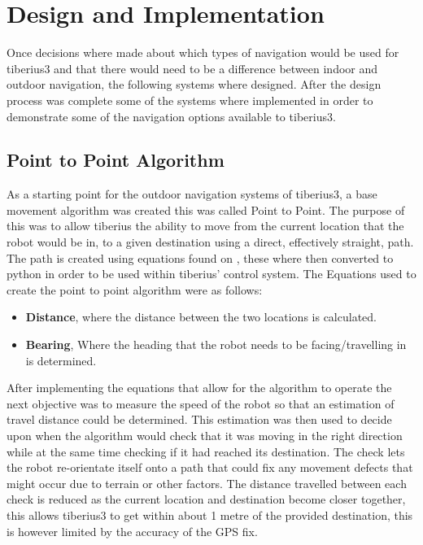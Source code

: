 \section{Design and Implementation}
Once decisions where made about which types of navigation would be used for \gls{tiberius3} and that there would need to be a difference between indoor and outdoor navigation, the following systems where designed. After the design process was complete some of the systems where implemented in order to demonstrate some of the navigation options available to \gls{tiberius3}. 
\subsection{Point to Point Algorithm}
\label{sec:nav_design_p2p} %
As a starting point for the outdoor navigation systems of \gls{tiberius3}, a base movement algorithm was created this was called Point to Point. The purpose of this was to allow tiberius the ability to move from the current location that the robot would be in, to a given destination using a direct, effectively straight, path. The path is created using equations found on \cite{lat-long-points}, these where then converted to python in order to be used within tiberius' control system. The Equations used to create the point to point algorithm were as follows:
\begin{itemize}
\item \textbf{Distance}, where the distance between the two locations is calculated.
\item \textbf{Bearing}, Where the heading that the robot needs to be facing/travelling in is determined.

\end{itemize}
After implementing the equations that allow for the algorithm to operate the next objective was to measure the speed of the robot so that an estimation of travel distance could be determined. This estimation was then used to decide upon when the algorithm would check that it was moving in the right direction while at the same time checking if it had reached its destination. The check lets the robot re-orientate itself onto a path that could fix any movement defects that might occur due to terrain or other factors. The distance travelled between each check is reduced as the current location and destination become closer together, this allows \gls{tiberius3} to get within about 1 metre of the provided destination, this is however limited by the accuracy of the \gls{GPS} fix.
